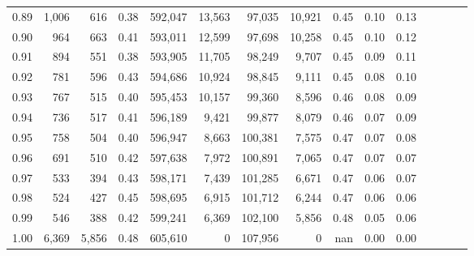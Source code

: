 \begin{tabular}{rrrcrrrrrrrrrrr}
0.89 &   1,006 &    616 &                                       0.38 &  592,047 &   13,563 &   97,035 &   10,921 &  0.45 &  0.10 &                         0.13 \\
0.90 &     964 &    663 &                                       0.41 &  593,011 &   12,599 &   97,698 &   10,258 &  0.45 &  0.10 &                         0.12 \\
0.91 &     894 &    551 &                                       0.38 &  593,905 &   11,705 &   98,249 &    9,707 &  0.45 &  0.09 &                         0.11 \\
0.92 &     781 &    596 &                                       0.43 &  594,686 &   10,924 &   98,845 &    9,111 &  0.45 &  0.08 &                         0.10 \\
0.93 &     767 &    515 &                                       0.40 &  595,453 &   10,157 &   99,360 &    8,596 &  0.46 &  0.08 &                         0.09 \\
0.94 &     736 &    517 &                                       0.41 &  596,189 &    9,421 &   99,877 &    8,079 &  0.46 &  0.07 &                         0.09 \\
0.95 &     758 &    504 &                                       0.40 &  596,947 &    8,663 &  100,381 &    7,575 &  0.47 &  0.07 &                         0.08 \\
0.96 &     691 &    510 &                                       0.42 &  597,638 &    7,972 &  100,891 &    7,065 &  0.47 &  0.07 &                         0.07 \\
0.97 &     533 &    394 &                                       0.43 &  598,171 &    7,439 &  101,285 &    6,671 &  0.47 &  0.06 &                         0.07 \\
0.98 &     524 &    427 &                                       0.45 &  598,695 &    6,915 &  101,712 &    6,244 &  0.47 &  0.06 &                         0.06 \\
0.99 &     546 &    388 &                                       0.42 &  599,241 &    6,369 &  102,100 &    5,856 &  0.48 &  0.05 &                         0.06 \\
1.00 &   6,369 &  5,856 &                                       0.48 &  605,610 &        0 &  107,956 &        0 &   nan &  0.00 &                         0.00 \\
\bottomrule
\end{tabular}
